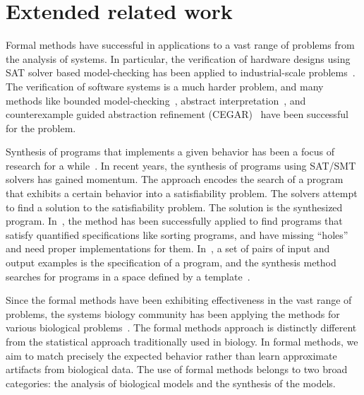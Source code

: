 \section{Extended related work}
\label{sec:related}

Formal methods have successful in applications to a vast range of
problems from the analysis of systems.
%
In particular,
the verification of hardware designs
using SAT solver based model-checking has been applied
to industrial-scale problems~\cite{biere1999symbolic2}.
%
The verification of software systems is a much harder problem, and
many methods like bounded model-checking~\cite{biere2003bounded},
abstract interpretation~\cite{lattice77}, and
counterexample guided abstraction refinement (CEGAR)~\cite{ClarkeCEGAR} have
been successful for the problem.
%

Synthesis of programs that implements a given behavior
has been a focus of research for a while~\cite{PnueliSynthesis}.
%
In recent years, the synthesis of programs using SAT/SMT solvers
has gained momentum.
%
The approach encodes the search of a program that exhibits a certain
behavior into a satisfiability problem.
%
The solvers attempt to find a solution to the satisfiability problem.
%
The solution is the synthesized program.
%
In~\cite{SrivastavaSynthesis,Solar-Lezama2005},
the method has been successfully applied
to find programs that satisfy quantified specifications like sorting
programs, and have missing ``holes'' and need proper implementations
for them.
%
In~\cite{exampleSynth},
a set of pairs of input and output examples is the specification of a program,
and the synthesis method searches for programs in a space defined by a
template~\cite{sygus}.



Since the formal methods have been exhibiting effectiveness in the vast
range of problems, the
systems biology community has been applying the methods for various
biological problems~\cite{fisher2007executable}.
The formal methods approach is distinctly different from the statistical
approach traditionally used in biology.
In formal methods, we aim to match precisely the expected behavior rather
than learn approximate artifacts from biological data.
The use of formal methods belongs to two broad categories:
the analysis of biological models and the synthesis of the models.

